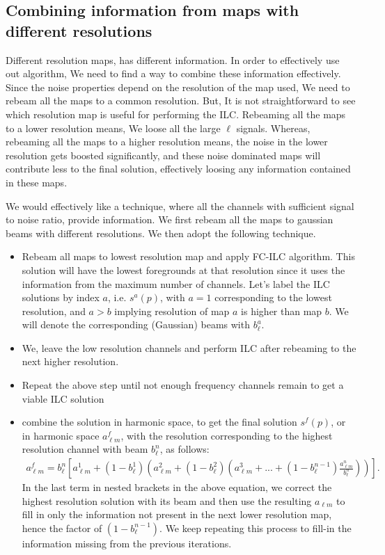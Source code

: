 \subsection{Combining information from maps with different resolutions}
Different resolution maps, has different information. In order to effectively use
out algorithm, We need to find a way to combine these information effectively. \cite{datarishi}
Since the noise properties depend on the resolution of the map used, We need to rebeam
all the maps to a common resolution. 
But, It is not straightforward to see which resolution map is useful for performing the ILC.
Rebeaming all the maps to a lower resolution means, We loose all the large $\ell$ signals. Whereas,
rebeaming all the maps to a higher resolution means, the noise in the lower resolution gets boosted
significantly, and these noise dominated maps will contribute less to the final solution, 
effectively loosing any information contained in these maps.

We would effectively like a technique, where all the channels with sufficient signal to noise ratio, provide information.
We first rebeam all the maps to gaussian beams with different resolutions. We then adopt the following technique.
\begin{itemize}
\item Rebeam all maps to lowest resolution map and apply FC-ILC
  algorithm. This solution will have the lowest foregrounds at that resolution
  since it uses the information from the maximum number of channels. Let's
  label the ILC solutions by index $a$, i.e. $s^a(p)$, with $a=1$ corresponding to the
  lowest resolution, and $a>b$ implying resolution of map $a$ is higher
  than map $b$. We will denote the corresponding (Gaussian) beams with $b_{\ell}^a$.
\item We, leave the low resolution channels and perform ILC after rebeaming to the next higher resolution.
\item Repeat the above step until not enough frequency channels remain to get a
  viable ILC solution
\item combine the solution in harmonic space, to get
  the final solution $s^f(p)$, or in harmonic space $a_{\ell m}^f$, with the resolution corresponding to the
  highest resolution channel with beam $b_{\ell}^n$, as follows:
\begin{align}
a_{\ell m}^f= 
b_{\ell}^n\left[a_{\ell m}^1+(1-b_{\ell}^{1})\left( a_{\ell m}^{2} + (1-b_{\ell}^{2})
\left(  a_{\ell m}^{3} + ... + \left(1-b_{\ell}^{n-1}\right)\frac{a_{\ell m}^n }{b_{\ell}^n}\right)\right)\right].
\end{align}
In the last term in nested brackets in the above equation, we correct the
highest resolution solution with its beam and then use the resulting
$a_{\ell m}$ to fill in only the information not present in the next lower
resolution map, hence the factor of $(1-b_{\ell}^{n-1})$.
We keep repeating this process to fill-in the information missing from the previous iterations.
\end{itemize}


